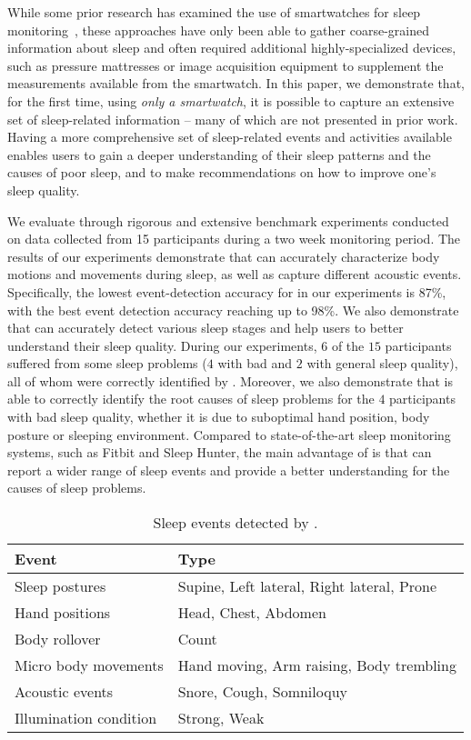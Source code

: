 While some prior research has examined the use of smartwatches for sleep
monitoring~\cite{pombo2016ubisleep,shelgikar2016sleep,haescher2015anomaly,borazio2012combining}, these approaches have only been able to
gather coarse-grained information about sleep and often required additional highly-specialized devices, such as pressure mattresses or
image acquisition equipment to supplement the measurements available from the smartwatch. In this paper, we demonstrate that, for the first
time, using {\em only a smartwatch}, it is possible to capture an extensive set of sleep-related information -- many of which are not
presented in prior work. Having a more comprehensive set of sleep-related events and activities available enables users to gain a deeper
understanding of their sleep patterns and the causes of poor sleep, and to make recommendations on how to improve one's sleep quality.

We evaluate {\systemname} through rigorous and extensive benchmark experiments conducted on data collected from 15 participants during a
two week monitoring period. The results of our experiments demonstrate that {\systemname} can accurately characterize body motions and
movements during sleep, as well as capture different acoustic events. Specifically, the lowest event-detection accuracy for {\systemname}
in our experiments is 87\%, with the best event detection accuracy reaching up to 98\%. We also demonstrate that {\systemname} can
accurately detect various sleep stages and help users to better understand their sleep quality. During our experiments, $6$ of the $15$
participants suffered from some sleep problems ($4$ with bad and $2$ with general sleep quality), all of whom were correctly identified by
{\systemname}. Moreover, we also demonstrate that {\systemname} is able to correctly identify the root causes of sleep problems for the $4$
participants with bad sleep quality, whether it is due to suboptimal hand position, body posture or sleeping environment. Compared to
state-of-the-art sleep monitoring systems, such as Fitbit and Sleep Hunter, the main advantage of {\systemname} is that can report a wider
range of sleep events and provide a better understanding for the causes of sleep problems.

\begin{table}[!t]
 \caption{\label{tab:test}Sleep events detected by \systemname.}
 \centering
 \small
 \begin{tabular}{ll}
  \toprule
  \textbf{Event}& \textbf{Type} \\
  \midrule
\rowcolor{Gray}  Sleep postures & Supine, Left lateral, Right lateral, Prone\\
 Hand positions & Head, Chest, Abdomen\\
\rowcolor{Gray} Body rollover & Count\\
 Micro body movements& Hand moving, Arm raising, Body trembling \\
\rowcolor{Gray} Acoustic events & Snore, Cough, Somniloquy  \\
 Illumination condition & Strong, Weak  \\
  \bottomrule
 \end{tabular}
\end{table}


